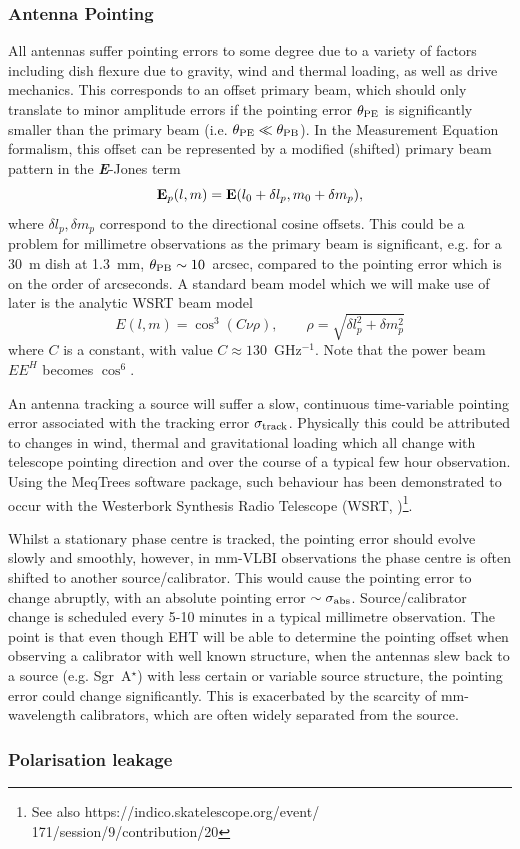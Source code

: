 \subsubsection{Antenna Pointing}
All antennas suffer pointing errors to some degree due to a variety of factors including dish flexure due to gravity, wind and thermal loading, as well as drive mechanics. This corresponds to an offset primary beam, which should only translate to minor amplitude errors if the pointing error $\theta_{\rm PE}$ is significantly smaller than the primary beam (i.e. $\theta_{\rm PE} \ll \theta_{\rm PB}$). In the Measurement Equation formalism, this offset can be represented by a modified (shifted) primary beam pattern in the {\bf \it E}-Jones term 
\begin{equation}
{\bf E}_p(l,m) = {\bf E}(l_0 + \delta l_p, m_0 + \delta m_p),
\end{equation}
where $\delta l_p, \delta m_p$ correspond to the directional cosine offsets.
This could be a problem for millimetre observations as the primary beam is significant, e.g. for a 30~m dish at 1.3~mm, $\theta_{\rm PB} \sim 10$~arcsec, compared to the pointing error which is on the order of arcseconds.
A standard beam model which we will make use of later is the analytic WSRT beam model \citep{Popping_2008} 
\begin{equation}
E(l, m) = \cos^3(C\nu \rho),\qquad   \rho = \sqrt{\delta l_p^2 + \delta m_p^2}
\end{equation}
where $C$ is a constant, with value $C \approx 130$~GHz$^{-1}$. Note that the power beam $EE^H$ becomes $\cos^6$. 

An antenna tracking a source will suffer a slow, continuous time-variable pointing error associated with the tracking error $\sigma_{\rm track}$. Physically this could be attributed to changes in wind, thermal and gravitational loading which all change with telescope pointing direction and over the course of a typical few hour observation. Using the MeqTrees software package, such behaviour has been demonstrated to occur with the Westerbork Synthesis Radio Telescope (WSRT, \cite{Smirnov_2011c})\footnote{See also https://indico.skatelescope.org/event/\\171/session/9/contribution/20}.


Whilst a stationary phase centre is tracked, the pointing error should evolve slowly and smoothly, however, in mm-VLBI observations the phase centre is often shifted to another source/calibrator. This would cause the pointing error to change abruptly, with an absolute pointing error $\sim \sigma_{\rm abs}$. Source/calibrator change is scheduled every 5-10 minutes in a typical millimetre observation. The point is that even though EHT will be able to determine the pointing offset when observing a calibrator with well known structure, when the antennas slew back to a source (e.g. Sgr~A$^\star$) with less certain or variable source structure, the pointing error could change significantly. This is exacerbated by the scarcity of mm-wavelength calibrators, which are often widely separated from the source.


\subsubsection{Polarisation leakage}




